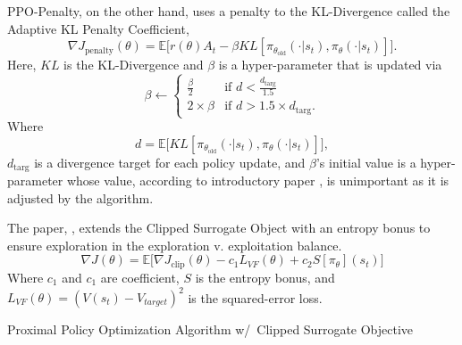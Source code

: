 PPO-Penalty, on the other hand, uses a penalty to the KL-Divergence called the Adaptive KL Penalty Coefficient, $$\nabla J_{\text{penalty}}(\theta)=\mathbb{E}\big[r(\theta)A_t - \beta KL[\pi_{\theta_\text{old}}(\cdot | s_t), \pi_\theta (\cdot | s_t)]\big].$$ Here, $KL$ is the KL-Divergence and $\beta$ is a hyper-parameter that is updated via 
\begin{equation*}
	\beta \leftarrow \begin{cases}
		\frac{\beta}{2} &\mbox{if }d<\frac{d_{\text{targ}}}{1.5} \\
		2\times \beta &\mbox{if }d>1.5\times d_{\text{targ}}.
	\end{cases}
\end{equation*} Where $$d=\mathbb{E}\big[KL[\pi_{\theta_{\text{old}}}(\cdot | s_t), \pi_\theta(\cdot | s_t)]\big],$$ $d_\text{targ}$ is a divergence target for each policy update, and $\beta$'s initial value is a hyper-parameter whose value, according to introductory paper \cite{schulman_wolski_dharwal_radford_klimov_2017}, is unimportant as it is adjusted by the algorithm.

The paper, \cite{schulman_wolski_dharwal_radford_klimov_2017}, extends the Clipped Surrogate Object with an entropy bonus to ensure exploration in the exploration v. exploitation balance. \begin{equation}\label{eq:PPO_objective}
\nabla J(\theta)=\mathbb{E}\big[\nabla J_{\text{clip}}(\theta) - c_1 L_{VF}(\theta)+c_2 S[\pi_\theta](s_t)\big]\end{equation} Where $c_1$ and $c_1$ are coefficient, $S$ is the entropy bonus, and $L_{VF}(\theta)=(V(s_t)-V_{target})^2$ is the squared-error loss.

\begin{algorithm}\label{algo:PPO}
	\SetAlgoLined
	\DontPrintSemicolon
	\caption{Proximal Policy Optimization Algorithm w/\ Clipped Surrogate Objective}
\end{algorithm}